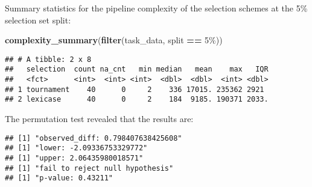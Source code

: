 \documentclass[
]{book}
\newenvironment{Shaded}{\begin{snugshade}}{\end{snugshade}}
\newcommand{\AttributeTok}[1]{\textcolor[rgb]{0.13,0.29,0.53}{#1}}
\newcommand{\DecValTok}[1]{\textcolor[rgb]{0.00,0.00,0.81}{#1}}
\newcommand{\FunctionTok}[1]{\textcolor[rgb]{0.13,0.29,0.53}{\textbf{#1}}}
\newcommand{\NormalTok}[1]{#1}
\newcommand{\OtherTok}[1]{\textcolor[rgb]{0.56,0.35,0.01}{#1}}
\newcommand{\SpecialCharTok}[1]{\textcolor[rgb]{0.81,0.36,0.00}{\textbf{#1}}}
\newcommand{\StringTok}[1]{\textcolor[rgb]{0.31,0.60,0.02}{#1}}
\begin{document}
Summary statistics for the pipeline complexity of the selection schemes at the 5\% selection set split:

\begin{Shaded}
\begin{Highlighting}[]
\FunctionTok{complexity\_summary}\NormalTok{(}\FunctionTok{filter}\NormalTok{(task\_data, split }\SpecialCharTok{==} \StringTok{\textquotesingle{}5\%\textquotesingle{}}\NormalTok{))}
\end{Highlighting}
\end{Shaded}

\begin{verbatim}
## # A tibble: 2 x 8
##   selection  count na_cnt   min median   mean    max   IQR
##   <fct>      <int>  <int> <int>  <dbl>  <dbl>  <int> <dbl>
## 1 tournament    40      0     2    336 17015. 235362 2921 
## 2 lexicase      40      0     2    184  9185. 190371 2033.
\end{verbatim}

The permutation test revealed that the results are:

\begin{Shaded}
\end{Shaded}

\begin{verbatim}
## [1] "observed_diff: 0.798407638425608"
## [1] "lower: -2.09336753329772"
## [1] "upper: 2.06435980018571"
## [1] "fail to reject null hypothesis"
## [1] "p-value: 0.43211"
\end{verbatim}
\end{document}
